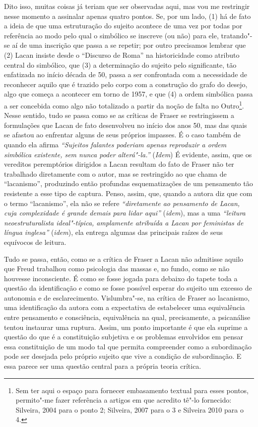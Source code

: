 Dito isso, muitas coisas já teriam que ser observadas aqui, mas vou me
restringir nesse momento a assinalar apenas quatro pontos. Se, por um
lado, (1) há de fato a ideia de que uma estruturação do sujeito acontece
de uma vez por todas por referência ao modo pelo qual o simbólico se
inscreve (ou não) para ele, tratando"-se aí de uma inscrição que passa a
se repetir; por outro precisamos lembrar que (2) Lacan insiste desde o
``Discurso de Roma'' na historicidade como atributo central do
simbólico, que (3) a determinação do sujeito pelo significante, tão
enfatizada no início década de 50, passa a ser confrontada com a
necessidade de reconhecer aquilo que é trazido pelo corpo com a
construção do grafo do desejo, algo que começa a acontecer em torno de
1957, e que (4) a ordem simbólica passa a ser concebida como algo não
totalizado a partir da noção de falta no Outro\footnote{Sem ter aqui o
  espaço para fornecer embasamento textual para esses pontos, permito"-me
  fazer referência a artigos em que acredito tê"-lo fornecido: Silveira,
  2004 para o ponto 2; Silveira, 2007 para o 3 e Silveira 2010 para o 4.}.
Nesse sentido, tudo se passa como se as críticas de Fraser se
restringissem a formulações que Lacan de fato desenvolveu no início dos
anos 50, mas das quais se afastou ao enfrentar alguns de seus próprios
impasses. É o caso também de quando ela afirma \emph{``Sujeitos falantes
poderiam apenas reproduzir a ordem simbólica existente, sem nunca poder
alterá"-la.''} (\emph{Idem}) É evidente, assim, que os vereditos
peremptórios dirigidos a Lacan resultam do fato de Fraser não ter
trabalhado diretamente com o autor, mas se restringido ao que chama de
``lacanismo'', produzindo então profundas esquematizações de um
pensamento tão resistente a esse tipo de captura. Penso, assim, que,
quando a autora diz que com o termo ``lacanismo'', ela não se refere
\emph{``diretamente ao pensamento de Lacan, cuja complexidade é grande
demais para lidar aqui''} (\emph{idem}), mas a uma \emph{``leitura
neoestruturalista ideal"-típica, amplamente atribuída a Lacan por
feministas de língua inglesa''} (\emph{idem}), ela entrega algumas das
principais raízes de seus equívocos de leitura.

Tudo se passa, então, como se a crítica de Fraser a Lacan não admitisse
aquilo que Freud trabalhou como psicologia das massas e, no fundo, como
se não houvesse inconsciente. É como se fosse jogada para debaixo do
tapete toda a questão da identificação e como se fosse possível esperar
do sujeito um excesso de autonomia e de esclarecimento. Vislumbra"-se, na
crítica de Fraser ao lacanismo, uma identificação da autora com a
expectativa de estabelecer uma equivalência entre pensamento e
consciência, equivalência na qual, precisamente, a psicanálise tentou
instaurar uma ruptura. Assim, um ponto importante é que ela suprime a
questão do que é a constituição subjetiva e os problemas envolvidos em
pensar essa constituição de um modo tal que permita compreender como a
subordinação pode ser desejada pelo próprio sujeito que vive a condição
de subordinação. E essa parece ser uma questão central para a própria
teoria crítica.

